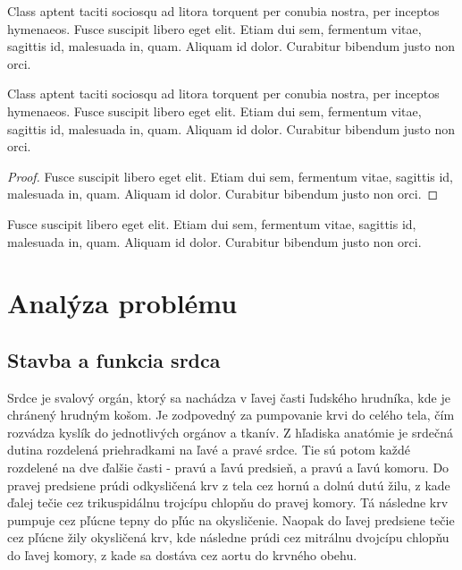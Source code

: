 \begin{example}
Class aptent taciti sociosqu ad litora torquent per conubia nostra, per inceptos hymenaeos. Fusce suscipit libero eget elit. Etiam dui sem, fermentum vitae, sagittis id, malesuada in, quam. Aliquam id dolor. Curabitur bibendum justo non orci.
\end{example}

\begin{theorem}
Class aptent taciti sociosqu ad litora torquent per conubia nostra, per inceptos hymenaeos. Fusce suscipit libero eget elit. Etiam dui sem, fermentum vitae, sagittis id, malesuada in, quam. Aliquam id dolor. Curabitur bibendum justo non orci.
\end{theorem}

\begin{proof}
Fusce suscipit libero eget elit. Etiam dui sem, fermentum vitae, sagittis id, malesuada in, quam. Aliquam id dolor. Curabitur bibendum justo non orci.
\end{proof}

\begin{corollary}
Fusce suscipit libero eget elit. Etiam dui sem, fermentum vitae, sagittis id, malesuada in, quam. Aliquam id dolor. Curabitur bibendum justo non orci.
\end{corollary}




\chapter{Analýza problému}

\section{Stavba a funkcia srdca}

Srdce je svalový orgán, ktorý sa nachádza v ľavej časti ľudského hrudníka, kde je chránený hrudným košom. Je zodpovedný za pumpovanie krvi do celého tela, čím rozvádza kyslík do jednotlivých orgánov a tkanív. Z hľadiska anatómie je srdečná dutina rozdelená priehradkami na ľavé a pravé srdce. Tie sú potom každé rozdelené na dve ďalšie časti - pravú a ľavú predsieň, a pravú a ľavú komoru. Do pravej predsiene prúdi odkysličená krv z tela cez hornú a dolnú dutú žilu, z kade ďalej tečie cez trikuspidálnu trojcípu chlopňu do pravej komory. Tá následne krv pumpuje cez pľúcne tepny do pľúc na okysličenie. Naopak do ľavej predsiene tečie cez pľúcne žily okysličená krv, kde následne prúdi cez mitrálnu dvojcípu chlopňu do ľavej komory, z kade sa dostáva cez aortu do krvného obehu.\cite{Weinhaus}\cite{Britannica_2024}

